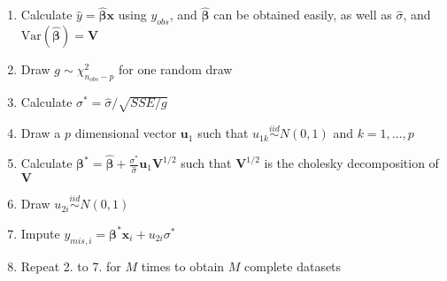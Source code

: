 \documentclass[preprint,12pt]{elsarticle}
\begin{document}
\begin{enumerate} 
    \item Calculate $\hat{y}=\hat{\boldsymbol{\beta}}\mathbf{x}$ using $y_{obs}$, and $\hat{\boldsymbol{\beta}}$ can be obtained easily, as well as $\hat{\sigma}$, and $\text{Var}(\hat{\boldsymbol{\beta}})=\mathbf{V}$
    \item Draw $g\sim \chi^2_{n_{obs}-p}$ for one random draw 
    \item Calculate $\sigma^*=\hat{\sigma}/\sqrt{SSE/g}$
    \item Draw a $p$ dimensional vector $\mathbf{u}_1$ such that $u_{1k}\stackrel{iid}{\sim} N(0,1)$ and $k=1,...,p$
    \item Calculate $\boldsymbol{\beta}^*=\hat{\boldsymbol{\beta}}+\frac{\sigma^*}{\hat{\sigma}}\mathbf{u}_1\mathbf{V}^{1/2}$ such that $\mathbf{V}^{1/2}$ is the cholesky decomposition of $\mathbf{V}$
    \item Draw $u_{2i}\stackrel{iid}{\sim} N(0,1)$ 
    \item Impute $y_{mis,i}=\boldsymbol{\beta}^*\mathbf{x}_i+u_{2i}\sigma^*$ 
    \item Repeat 2. to 7. for $M$ times to obtain $M$ complete datasets
\end{enumerate}
\end{document}
